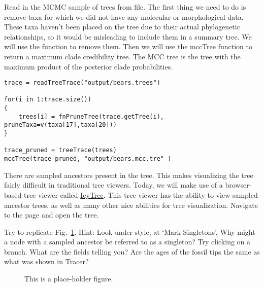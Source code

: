 Read in the MCMC sample of trees from file. The first thing we need to do is remove taxa for which we did not have any molecular or morphological data. These taxa haven't been placed on the tree due to their actual phylogenetic relationships, so it would be misleading to include them in a  summary tree. We will use the  function to remove them. Then we will use the mccTree function to return a maximum clade credibility tree. The MCC tree is the tree with the maximum product of the posterior clade probabilities.  \par
{\tt \begin{snugshade*}
\begin{lstlisting}
trace = readTreeTrace("output/bears.trees")

for(i in 1:trace.size())
{
    trees[i] = fnPruneTree(trace.getTree(i), pruneTaxa=v(taxa[17],taxa[20]))
}

trace_pruned = treeTrace(trees)
mccTree(trace_pruned, "output/bears.mcc.tre" )
\end{lstlisting}
\end{snugshade*}}

There are sampled ancestors present in the tree. This makes visualizing the tree fairly difficult in traditional tree viewers. Today, we will make use of a browser-based tree viewer called \href{http://tgvaughan.github.io/icytree/}{IcyTree}. This tree viewer has the ability to view sampled ancestor trees, as well as many other nice abilities for tree visualization. Navigate to the page and open the tree. 

Try to replicate Fig.\ \ref{fig:IcyTreeSumm}. Hint: Look under style, at `Mark Singletons'. Why might a node with a sampled ancestor be referred to as a singleton? Try clicking on a branch. What are the fields telling you? Are the ages of the fossil tips the same as what was shown in Tracer? 

\begin{figure}[h!]
\centering
{}
\caption{\small This is a place-holder figure.}
\label{fig:IcyTreeSumm}
\end{figure}






